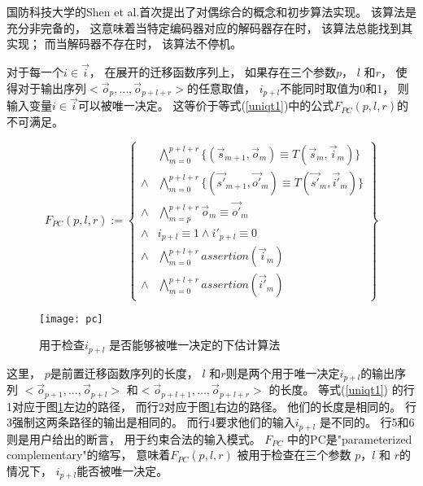 国防科技大学的Shen et al.首次提出了对偶综合的概念和初步算法实现。
该算法是充分非完备的，
这意味着当特定编码器对应的解码器存在时，
该算法总能找到其实现；
而当解码器不存在时，
该算法不停机。

对于每一个$i\in\vec{i}$，
在展开的迁移函数序列上，
如果存在三个参数$p$， $l$ 和$r$，
使得对于输出序列$<\vec{o}_p,\dots,\vec{o}_{p+l+r}>$的任意取值，
$i_{p+l}$不能同时取值为0和1，
则输入变量$i\in\vec{i}$可以被唯一决定。
这等价于等式(\ref{uniqt1})中的公式$F_{PC}(p,l,r)$的不可满足。

\begin{equation}\label{uniqt1}
F_{PC}(p,l,r):=
\left\{
\begin{array}{cc}
&\bigwedge_{m=0}^{p+l+r}
\{
(\vec{s}_{m+1},\vec{o}_m)\equiv T(\vec{s}_m,\vec{i}_m)
\}
\\
\wedge&\bigwedge_{m=0}^{p+l+r}
\{
(\vec{s'}_{m+1},\vec{o'}_m)\equiv T(\vec{s'}_m,\vec{i'}_m)
\}
\\
\wedge&\bigwedge_{m=p}^{p+l+r}\vec{o}_m\equiv \vec{o'}_m \\
\wedge& i_{p+l}\equiv 1 \wedge  i'_{p+l}\equiv 0 \\
\wedge&\bigwedge_{m=0}^{p+l+r}assertion(\vec{i}_m) \\
\wedge&\bigwedge_{m=0}^{p+l+r}assertion(\vec{i'}_m)
\end{array}
\right\}
\end{equation}

\begin{figure}[t]
\begin{center}
\texttt{[image: pc]}
\end{center}
\caption{用于检查$i_{p+l}$ 是否能够被唯一决定的下估计算法}
  \label{fig_pc_double}
\end{figure}


这里，
$p$是前置迁移函数序列的长度，
$l$ 和$r$则是两个用于唯一决定$i_{p+l}$的输出序列
$<\vec{o}_{p+1},\dots,\vec{o}_{p+l}>$ 和$<\vec{o}_{p+l+1},\dots,\vec{o}_{p+l+r}>$
的长度。
等式(\ref{uniqt1}) 的行1对应于图\ref{fig_pc_double}左边的路径，
而行2对应于图\ref{fig_pc_double}右边的路径。
他们的长度是相同的。
行3强制这两条路径的输出是相同的。
而行4要求他们的输入$i_{p+l}$ 是不同的。
行5和6则是用户给出的断言，
用于约束合法的输入模式。
$F_{PC}$ 中的PC是"parameterized complementary"的缩写，
意味着$F_{PC}(p,l,r)$ 被用于检查在三个参数 $p$，$l$ 和 $r$的情况下，
$i_{p+l}$能否被唯一决定。


